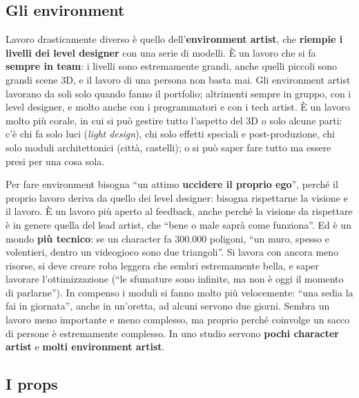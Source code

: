 \subsection{Gli environment}

Lavoro drasticamente diverso è quello dell'\textbf{environment artist}, che
\textbf{riempie i livelli dei level designer} con una serie di modelli. È un
lavoro che si fa \textbf{sempre in team}: i livelli sono estremamente grandi,
anche quelli piccoli sono grandi scene 3D, e il lavoro di una persona non basta
mai. Gli environment artist lavorano da soli solo quando fanno il portfolio;
altrimenti sempre in gruppo, con i level designer, e molto anche con i
programmatori e con i tech artist. È un lavoro molto più corale, in cui si può
gestire tutto l'aspetto del 3D o solo alcune parti: c'è chi fa solo luci
(\emph{light design}), chi solo effetti speciali e post-produzione, chi solo
moduli architettonici (città, castelli); o si può saper fare tutto ma essere
presi per una cosa sola.

Per fare environment bisogna ``un attimo \textbf{uccidere il proprio ego}'',
perché il proprio lavoro deriva da quello dei level designer: bisogna
rispettarne la visione e il lavoro. È un lavoro più aperto al feedback, anche
perché la visione da rispettare è in genere quella del lead artist, che
``bene o male saprà come funziona''. Ed è un mondo \textbf{più tecnico}: se un
character fa 300.000 poligoni, ``un muro, spesso e volentieri, dentro un
videogioco sono due triangoli''. Si lavora con ancora meno risorse, si deve
creare roba leggera che sembri estremamente bella, e saper lavorare
l'ottimizzazione (``le sfumature sono infinite, ma non è oggi il momento di
parlarne''). In compenso i moduli si fanno molto più velocemente: ``una sedia
la fai in giornata'', anche in un'oretta, ad alcuni servono due giorni. Sembra
un lavoro meno importante e meno complesso, ma proprio perché coinvolge un
sacco di persone è estremamente complesso. In uno studio servono \textbf{pochi
character artist} e \textbf{molti environment artist}.

\subsection{I props}

